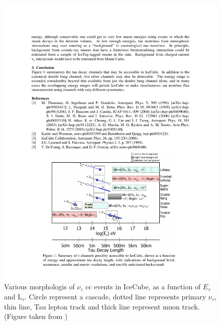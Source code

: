 \begin{figure}
	\centering \includegraphics{./figures/nu_in_icecube/tau_interactions.pdf}
	\caption{Various morphologis of $\nu_{\tau}$ cc events in IceCube, as a function of $E_{\tau}$ and $\mathrm{L}_\tau$. Circle represent a cascade, dotted line represents primary $\nu_{\tau}$, thin line, Tau lepton track and thick line represent muon track.(Figure taken from \cite{Tau_int_inice})}
\end{figure}

